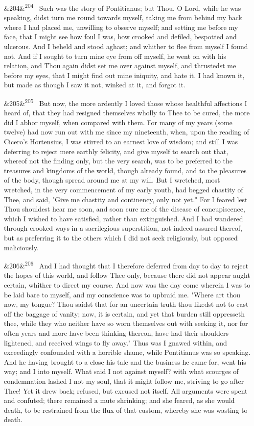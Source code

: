 \documentclass[12pt]{article}
\newcommand{\para}[1][]{\par\noindent\ifx&#1&\else\textsuperscript{\footnotesize #1}~\fi}
\begin{document}
\para[204] Such was the story of Pontitianus; but Thou, O Lord, while he was speaking, didst turn me round towards myself, taking me from behind my back where I had placed me, unwilling to observe myself; and setting me before my face, that I might see how foul I was, how crooked and defiled, bespotted and ulcerous. And I beheld and stood aghast; and whither to flee from myself I found not. And if I sought to turn mine eye from off myself, he went on with his relation, and Thou again didst set me over against myself, and thrustedst me before my eyes, that I might find out mine iniquity, and hate it. I had known it, but made as though I saw it not, winked at it, and forgot it.

\para[205] But now, the more ardently I loved those whose healthful affections I heard of, that they had resigned themselves wholly to Thee to be cured, the more did I abhor myself, when compared with them. For many of my years (some twelve) had now run out with me since my nineteenth, when, upon the reading of Cicero's Hortensius, I was stirred to an earnest love of wisdom; and still I was deferring to reject mere earthly felicity, and give myself to search out that, whereof not the finding only, but the very search, was to be preferred to the treasures and kingdoms of the world, though already found, and to the pleasures of the body, though spread around me at my will. But I wretched, most wretched, in the very commencement of my early youth, had begged chastity of Thee, and said, "Give me chastity and continency, only not yet." For I feared lest Thou shouldest hear me soon, and soon cure me of the disease of concupiscence, which I wished to have satisfied, rather than extinguished. And I had wandered through crooked ways in a sacrilegious superstition, not indeed assured thereof, but as preferring it to the others which I did not seek religiously, but opposed maliciously.

\para[206] And I had thought that I therefore deferred from day to day to reject the hopes of this world, and follow Thee only, because there did not appear aught certain, whither to direct my course. And now was the day come wherein I was to be laid bare to myself, and my conscience was to upbraid me. "Where art thou now, my tongue? Thou saidst that for an uncertain truth thou likedst not to cast off the baggage of vanity; now, it is certain, and yet that burden still oppresseth thee, while they who neither have so worn themselves out with seeking it, nor for often years and more have been thinking thereon, have had their shoulders lightened, and received wings to fly away." Thus was I gnawed within, and exceedingly confounded with a horrible shame, while Pontitianus was so speaking. And he having brought to a close his tale and the business he came for, went his way; and I into myself. What said I not against myself? with what scourges of condemnation lashed I not my soul, that it might follow me, striving to go after Thee! Yet it drew back; refused, but excused not itself. All arguments were spent and confuted; there remained a mute shrinking; and she feared, as she would death, to be restrained from the flux of that custom, whereby she was wasting to death.
\end{document}
